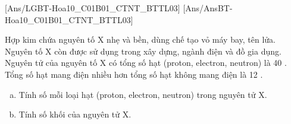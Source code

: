 [Ans/LGBT-Hoa10_C01B01_CTNT_BTTL03]
[Ans/AnsBT-Hoa10_C01B01_CTNT_BTTL03]
\begin{bt}[KNTT]%
	Hợp kim chứa nguyên tố $\mathrm{X}$ nhẹ và bền, dùng chế tạo vỏ máy bay, tên lửa. Nguyên tố $\mathrm{X}$ còn được sử dụng trong xây dựng, ngành điện và đồ gia dụng. Nguyên tử của nguyên tố $\mathrm{X}$ có tổng số hạt (proton, electron, neutron) là 40 . Tổng số hạt mang điện nhiều hơn tổng số hạt không mang điện là 12 .
	\begin{enumerate}[a)]
		\item Tính số mỗi loại hạt (proton, electron, neutron) trong nguyên tử $\mathrm{X}$.
		\item Tính số khối của nguyên tử $\mathrm{X}$.
	\end{enumerate}
\end{bt}
